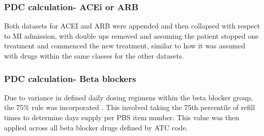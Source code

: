 \documentclass[11pt]{article}
\begin{document}
\subsubsection{PDC calculation- ACEi or ARB}
Both datasets for ACEI and ARB were appended and then collapsed with respect to MI admission, with double ups removed and assuming the patient stopped one treatment and commenced the new treatment, similar to how it was assumed with drugs within the same classes for the other datasets. 
\color{violet}
\begin{stlog}\end{stlog}
\color{black}
\subsubsection{PDC calculation- Beta blockers} \label{PDC calculation- Beta blockers}
Due to variance in defined daily dosing regimens within the beta blocker group, the 75\% rule was incorporated \cite{pdc2021}. This involved taking the 75th percentile of refill times to determine days supply per PBS item number. This value was then applied across all beta blocker drugs defined by ATC code. 
\color{violet}
\begin{stlog}\end{stlog}
\color{black}
\end{document}
